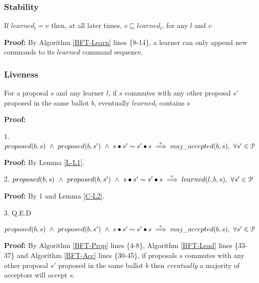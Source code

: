 \subsubsection{Stability}
\begin{theorem}
If $learned_l = v$ then, at all later times, $v \sqsubseteq learned_l$, for any $l$ and $v$ \par \label{S-T1}
\end{theorem} 
\textbf{Proof:} By Algorithm \ref{BFT-Learn} lines \{8-14\}, a learner can only append new commands to its $learned$ command sequence.

\subsubsection{Liveness}
\begin{theorem}
For a proposal $s$ and any learner $l$, if $s$ commutes with any other proposal $s'$ proposed in the same ballot $b$, eventually $learned_l$ contains $s$ \label{L-T1} \par
\end{theorem} 
\textbf{Proof:} \par
1. $proposed(b,s)\ \land\ proposed(b,s')\ \land\ s\bullet s' \thicksim  s' \bullet s  \overset{e}{\implies} maj\_accepted(b,s),\ \forall s' \in \mathcal{P}$ \par
\indent\indent\textbf{Proof:} By Lemma \ref{L-L1}.\par
2. $proposed(b,s)\ \land\ proposed(b,s')\ \land\ s\bullet s' \thicksim s' \bullet s \overset{e}{\implies} learned(l,b,s),\ \forall s' \in \mathcal{P}$ \par
\indent\indent\textbf{Proof:} By 1 and Lemma \ref{C-L2}. \par
3. Q.E.D

\begin{lemma}
$proposed(b,s)\ \land\ proposed(b,s')\ \land\ s\bullet s' \thicksim  s' \bullet s \overset{e}{\implies} maj\_accepted(b,s),\ \forall s' \in \mathcal{P}$ \label{L-L1}
\end{lemma}
\textbf{Proof:} By Algorithm \ref{BFT-Prop} lines \{4-8\}, Algorithm \ref{BFT-Lead} lines \{33-37\} and Algorithm \ref{BFT-Acc} lines \{30-45\}, if proposals $s$ commutes with any other proposal $s'$ proposed in the same ballot $b$ then \textit{eventually} a majority of acceptors will accept $s$. \par
